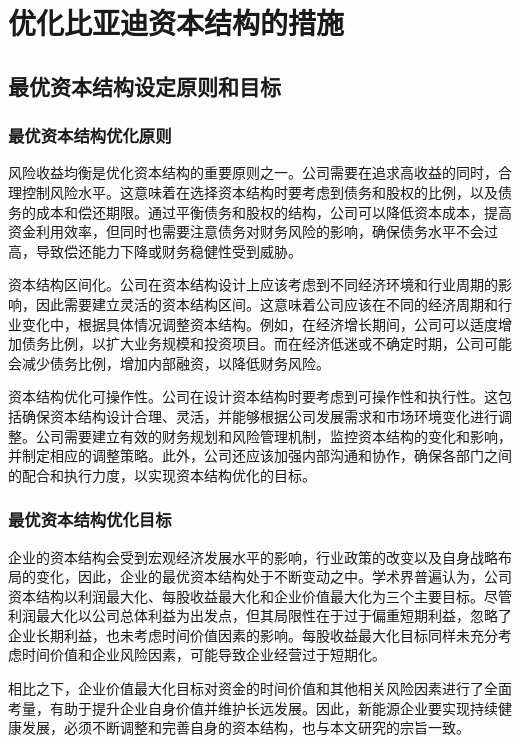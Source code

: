 \chapter{优化比亚迪资本结构的措施}

\section{最优资本结构设定原则和目标}
\subsection{最优资本结构优化原则}
风险收益均衡是优化资本结构的重要原则之一。公司需要在追求高收益的同时，合理控制风险水平。这意味着在选择资本结构时要考虑到债务和股权的比例，以及债务的成本和偿还期限。通过平衡债务和股权的结构，公司可以降低资本成本，提高资金利用效率，但同时也需要注意债务对财务风险的影响，确保债务水平不会过高，导致偿还能力下降或财务稳健性受到威胁。

资本结构区间化。公司在资本结构设计上应该考虑到不同经济环境和行业周期的影响，因此需要建立灵活的资本结构区间。这意味着公司应该在不同的经济周期和行业变化中，根据具体情况调整资本结构。例如，在经济增长期间，公司可以适度增加债务比例，以扩大业务规模和投资项目。而在经济低迷或不确定时期，公司可能会减少债务比例，增加内部融资，以降低财务风险。

资本结构优化可操作性。公司在设计资本结构时要考虑到可操作性和执行性。这包括确保资本结构设计合理、灵活，并能够根据公司发展需求和市场环境变化进行调整。公司需要建立有效的财务规划和风险管理机制，监控资本结构的变化和影响，并制定相应的调整策略。此外，公司还应该加强内部沟通和协作，确保各部门之间的配合和执行力度，以实现资本结构优化的目标。
\subsection{最优资本结构优化目标}
企业的资本结构会受到宏观经济发展水平的影响，行业政策的改变以及自身战略布局的变化，因此，企业的最优资本结构处于不断变动之中。学术界普遍认为，公司资本结构以利润最大化、每股收益最大化和企业价值最大化为三个主要目标。尽管利润最大化以公司总体利益为出发点，但其局限性在于过于偏重短期利益，忽略了企业长期利益，也未考虑时间价值因素的影响。每股收益最大化目标同样未充分考虑时间价值和企业风险因素，可能导致企业经营过于短期化。

相比之下，企业价值最大化目标对资金的时间价值和其他相关风险因素进行了全面考量，有助于提升企业自身价值并维护长远发展。因此，新能源企业要实现持续健康发展，必须不断调整和完善自身的资本结构，也与本文研究的宗旨一致。

